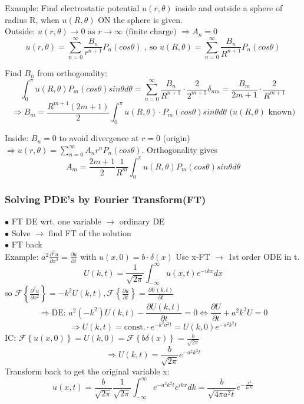 \documentclass[10pt,a4paper]{article}
\begin{document}
\begin{multicols}{2}
Example: Find electrostatic potential $u(r,\theta)$ inside and outside a sphere of radius R, when $u(R,\theta)$ ON the sphere is given.\\
\vspace{2mm}
Outside: \(u(r,\theta)\rightarrow 0 \text{ as } r\rightarrow \infty \text{ (finite charge) }\Rightarrow A_{n}=0\)
\[u(r,\theta) = \sum_{n=0}^{\infty}\frac{B_{n}}{r^{n+1}}P_{n}(cos\theta) \text{   , so   } 
u(R,\theta) = \sum_{n=0}^{\infty}\frac{B_{n}}{R^{n+1}}P_{n}(cos\theta)\]

Find $B_{n}$ from orthogonality: 
\[\int_{0}^{\pi}u(R,\theta)P_{m}(cos\theta)sin\theta d\theta = \sum_{n=0}^{\infty}\frac{B_{n}}{R^{n+1}}\cdot\frac{2}{2^{m+1}}\delta_{nm}=\frac{B_{m}}{2m+1}\cdot \frac{2}{R^{m+1}}\]
\[\Rightarrow B_{m} = \frac{R^{m+1}\left(2m+1\right)}{2}\int_{0}^{\pi}u(R,\theta)\cdot P_{m}(cos\theta)sin\theta d\theta \text{  ($u(R,\theta)$ known)} \]

Inside: $B_{n}=0$ to avoid divergence at $r=0$ (origin) \(\Rightarrow u(r,\theta)=\sum_{n=0}^{\infty}A_{n}r^{n}P_{n}(cos\theta)\).
Orthogonality gives
\[A_{m} = \frac{2m+1}{2}\frac{1}{R^{m}}\int_{0}^{\pi}u(R,\theta)P_{m}(cos\theta)sin\theta d\theta\]

\subsubsection*{Solving PDE's by Fourier Transform(FT)}
$\bullet$ FT DE wrt. one variable $\rightarrow$ ordinary DE \\
$\bullet$ Solve $\rightarrow$ find FT of the solution \\
$\bullet$ FT back \\
Example: \(a^{2}\frac{\partial^{2}u}{\partial x^{2}} = \frac{\partial u}{\partial t} \text{ with } u(x,0) = b\cdot \delta(x)\)
Use x-FT $\rightarrow$ 1st order ODE in t. \[U(k,t)=\frac{1}{\sqrt{2\pi}}\int_{-\infty}^{\infty}u(x,t)e^{-ikx}dx\]
so \(\mathcal{F}\left\{\frac{\partial^{2}u}{\partial x^{2}}\right\}=-k^{2}U(k,t), \mathcal{F}\left\{\frac{\partial u}{\partial t}\right\} = \frac{\partial U(k,t)}{\partial t}\)
\[\Rightarrow \text{DE: } a^{2}(-k^{2})U(k,t)-\frac{\partial U(k,t)}{\partial t}=0 \Leftrightarrow \frac{\partial U}{\partial t}+a^{2}k^{2}U=0\]
\[\Rightarrow U(k,t)=\text{const.}\cdot e^{-k^{2}a^{2}t}=U(k,0)e^{-a^{2}k^{2}t}\]
IC: \(\mathcal{F} \left\{u(x,0)\right\} = U(k,0)=\mathcal{F}\left\{b\delta(x)\right\}=\frac{b}{\sqrt{2\pi}}\)
\[\Rightarrow U(k,t)=\frac{b}{\sqrt{2\pi}}e^{-a^{2}k^{2}t}\]
Transform back to get the original variable x:
\[u(x,t)=\frac{b}{\sqrt{2\pi}}\frac{1}{\sqrt{2\pi}}\int_{-\infty}^{\infty}e^{-a^{2}k^{2}t}e^{ikx}dk = \frac{b}{\sqrt{4\pi a^{2}t}}e^{-\frac{x^{2}}{4a^{2}t}}\]






\end{multicols}
\end{document}

